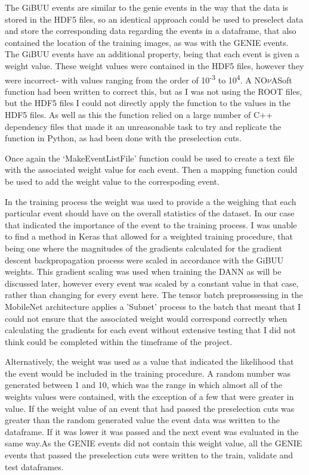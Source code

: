 \noindent The GiBUU events are similar to the genie events in the way that the data is stored in the HDF5 files, so an identical approach could be used to preselect data and store the corresponding data regarding the events in a dataframe, that also contained the location of the training images, as was with the GENIE events. The GiBUU events have an additional property, being that each event is given a weight value. These weight values were contained in the HDF5 files, however they were incorrect- with values ranging from the order of 10\textsuperscript{-3} to 10\textsuperscript{4}. A NO$\nu$ASoft function had been written to correct this, but as I was not using the ROOT files, but the HDF5 files I could not directly apply the function to the values in the HDF5 files. As well as this the function relied on a large number of C++ dependency files that made it an unreasonable task to try and replicate the function in Python, as had been done with the preselection cuts.\medskip

\noindent Once again the ‘MakeEventListFile' function could be used to create a text file with the associated weight value for each event. Then a mapping function could be used to add the weight value to the correspoding event.\medskip

\noindent In the training process the weight was used to provide a the weighing that each particular event should have on the overall statistics of the dataset. In our case that indicated the importance of the event to the training process. I was unable to find a method in Keras that allowed for a weighted training procedure, that being one where the magnitudes of the gradients calculated for the gradient descent backpropagation process were scaled in accordance with the GiBUU weights. This gradient scaling was used when training the DANN as will be discussed later, however every event was scaled by a constant value in that case, rather than changing for every event here. The tensor batch preprossessing in the MobileNet architecture applies a 'Subnet' process to the batch that meant that I could not ensure that the associated weight would correspond correctly when calculating the gradients for each event without extensive testing that I did not think could be completed within the timeframe of the project.\medskip

\noindent Alternatively, the weight was used as a value that indicated the likelihood that the event would be included in the training procedure. A random number was generated between 1 and 10, which was the range in which almost all of the weights values were contained, with the exception of a few that were greater in value. If the weight value of an event that had passed the preselection cuts was greater than the random generated value the event data was written to the dataframe. If it was lower it was passed and the next event was evaluated in the same way.As the GENIE events did not contain this weight value, all the GENIE events that passed the preselection cuts were written to the train, validate and test dataframes.\medskip

